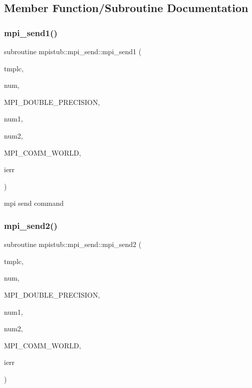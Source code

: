 \subsection{Member Function/\+Subroutine Documentation}
\mbox{\label{interfacempistub_1_1mpi__send_af2fa871f29ad9623f189a5f4cfc90bc9}} 
\subsubsection{\texorpdfstring{mpi\_send1()}{mpi\_send1()}}
{\footnotesize\ttfamily subroutine mpistub\+::mpi\+\_\+send\+::mpi\+\_\+send1 (\begin{DoxyParamCaption}\item[{double precision, dimension(\+:)}]{tmplc,  }\item[{}]{num,  }\item[{}]{M\+P\+I\+\_\+\+D\+O\+U\+B\+L\+E\+\_\+\+P\+R\+E\+C\+I\+S\+I\+ON,  }\item[{}]{num1,  }\item[{}]{num2,  }\item[{}]{M\+P\+I\+\_\+\+C\+O\+M\+M\+\_\+\+W\+O\+R\+LD,  }\item[{}]{ierr }\end{DoxyParamCaption})}



mpi send command 

\mbox{\label{interfacempistub_1_1mpi__send_a10cc2a781be157fda194cda05bb83748}} 
\subsubsection{\texorpdfstring{mpi\_send2()}{mpi\_send2()}}
{\footnotesize\ttfamily subroutine mpistub\+::mpi\+\_\+send\+::mpi\+\_\+send2 (\begin{DoxyParamCaption}\item[{double precision}]{tmplc,  }\item[{}]{num,  }\item[{}]{M\+P\+I\+\_\+\+D\+O\+U\+B\+L\+E\+\_\+\+P\+R\+E\+C\+I\+S\+I\+ON,  }\item[{}]{num1,  }\item[{}]{num2,  }\item[{}]{M\+P\+I\+\_\+\+C\+O\+M\+M\+\_\+\+W\+O\+R\+LD,  }\item[{}]{ierr }\end{DoxyParamCaption})}


